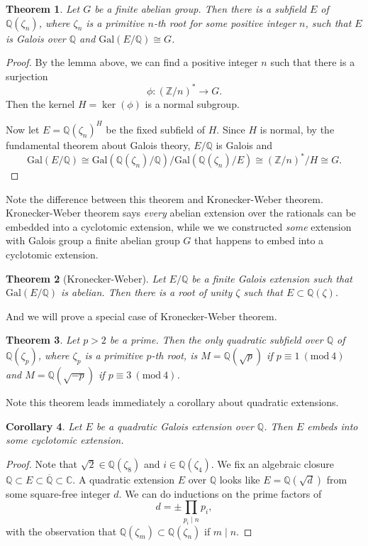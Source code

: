 \documentclass[12pt]{report}
\newtheorem{theorem}{Theorem}[section]
\newtheorem{corollary}[theorem]{Corollary}
\theoremstyle{definition}
\newcommand{\Mod}[1]{\ (\mathrm{mod}\ #1)}
\newcommand{\gal}{\text{Gal}}
\newcommand{\cc}{\mathbb{C}}
\newcommand{\zz}{\mathbb{Z}}
\newcommand{\qq}{\mathbb{Q}}
\begin{document}
\begin{theorem}
	Let $G$ be a finite abelian group. Then there is a subfield $E$ of $\qq(\zeta_n)$, where $\zeta_n$ is a primitive $n$-th root for some positive integer $n$, such that $E$ is Galois over $\qq$ and $\gal(E/\qq)\cong G$.
\end{theorem}

\begin{proof}
	By the lemma above, we can find a positive integer $n$ such that there is a surjection $$\phi:(\zz/n)^*\to G.$$ Then the kernel $H=\ker(\phi)$ is a normal subgroup.

	Now let $E=\qq(\zeta_n)^H$ be the fixed subfield of $H$. Since $H$ is normal, by the fundamental theorem about Galois theory, $E/\qq$ is Galois and \[\gal(E/\qq) \cong \gal(\qq(\zeta_n)/\qq)/\gal(\qq(\zeta_n)/E) \cong (\zz/n)^*/H \cong G.\]
\end{proof}

Note the difference between this theorem and Kronecker-Weber theorem. Kronecker-Weber theorem says \emph{every} abelian extension over the rationals can be embedded into a cyclotomic extension, while we we constructed \emph{some} extension with Galois group a finite abelian group $G$ that happens to embed into a cyclotomic extension.

\begin{theorem}[Kronecker-Weber]
	Let $E/\qq$ be a finite Galois extension such that $\gal(E/\qq)$ is abelian. Then there is a root of unity $\zeta$ such that $E \subset \qq(\zeta)$.
\end{theorem}

And we will prove a special case of Kronecker-Weber theorem.

\begin{theorem}\label{webspe}
	Let $p>2$ be a prime. Then the only quadratic subfield over $\qq$ of $\qq(\zeta_p)$, where $\zeta_p$ is a primitive $p$-th root, is $M=\qq(\sqrt{p})$ if $p\equiv 1\Mod{4}$ and $M=\qq(\sqrt{-p})$ if $p\equiv 3\Mod{4}$.
\end{theorem}

\noindent Note this theorem leads immediately a corollary about quadratic extensions.

\begin{corollary}
	Let $E$ be a quadratic Galois extension over $\qq$. Then $E$ embeds into some cyclotomic extension.
\end{corollary}

\begin{proof}
	Note that $\sqrt{2}\in \qq(\zeta_8)$ and $i\in \qq(\zeta_4)$. We fix an algebraic closure $\qq\subset E\subset\overline{\qq}\subset\cc$. A quadratic extension $E$ over $\qq$ looks like $E=\qq(\sqrt{d})$ from some square-free integer $d$. We can do inductions on the prime factors of $$d=\pm \prod_{p_i\mid n} p_i,$$ with the observation that $\qq(\zeta_m)\subset\qq(\zeta_n)$ if $m\mid n$.
\end{proof}
\end{document}
